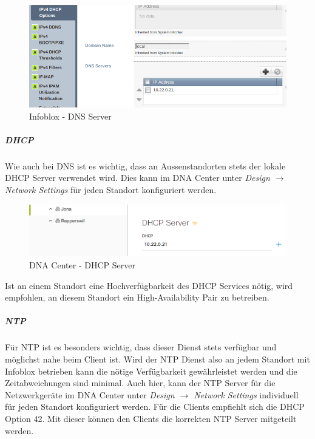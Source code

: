 \begin{figure}[H]
	\centering
	\includegraphics[width=1\linewidth]{img/Absicherung/Infoblox_DHCP_DNS_Server.png}
	\caption{Infoblox - DNS Server}
	\label{fig:Infoblox - DNS Server}
\end{figure}

\subparagraph{DHCP}

Wie auch bei DNS ist es wichtig, dass an Aussenstandorten stets der lokale DHCP Server verwendet wird. Dies kann im DNA Center unter \textit{Design $\rightarrow$ Network Settings} für jeden Standort konfiguriert werden. 

\begin{figure}[H]
	\centering
	\includegraphics[width=0.8\linewidth]{img/Absicherung/DNA_Center_DHCP-Server.png}
	\caption{DNA Center - DHCP Server }
	\label{fig:DNA Center - DHCP Server}
\end{figure}

Ist an einem Standort eine Hochverfügbarkeit des DHCP Services nötig, wird empfohlen, an diesem Standort ein High-Availability Pair zu betreiben.

\subparagraph{NTP}

Für NTP ist es besonders wichtig, dass dieser Dienst stets verfügbar und möglichst nahe beim Client ist. Wird der NTP Dienst also an jedem Standort mit Infoblox betrieben kann die nötige Verfügbarkeit gewährleistet werden und die Zeitabweichungen sind minimal.
Auch hier, kann der NTP Server für die Netzwerkgeräte im DNA Center unter \textit{Design $\rightarrow$ Network Settings} individuell für jeden Standort konfiguriert werden. Für die Clients empfiehlt sich die DHCP Option 42. Mit dieser können den Clients die korrekten NTP Server mitgeteilt werden.

